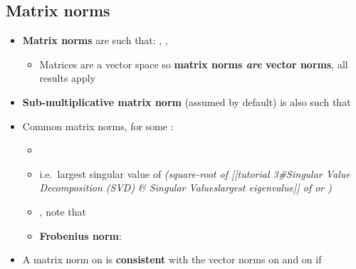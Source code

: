 \subsection*{Matrix norms}

\begin{itemize}

\item
  \textbf{Matrix norms} are such that:
  ,
  ,

  \begin{itemize}
  
  \item
    Matrices  are a vector space so
    \textbf{matrix norms \emph{are} vector norms}, all results apply
  \end{itemize}
\item
  \textbf{Sub-multiplicative matrix norm} (assumed by default) is also
  such that
\item
  Common matrix norms, for some
  :

  \begin{itemize}
  
  \item
  \item
    i.e.~largest singular value of  \emph{(square-root of
    {[}{[}tutorial 3\#Singular Value Decomposition (SVD) \& Singular
    Values\textbar largest eigenvalue{]}{]} of  or
    )}
  \item
    ,
    note that
  \item
    \textbf{Frobenius norm}:
  \end{itemize}
\item
  A matrix norm \iMbox{\|\cdot\|} on  is
  \textbf{consistent} with the vector norms  on
   and  on 
  if


\end{itemize}
